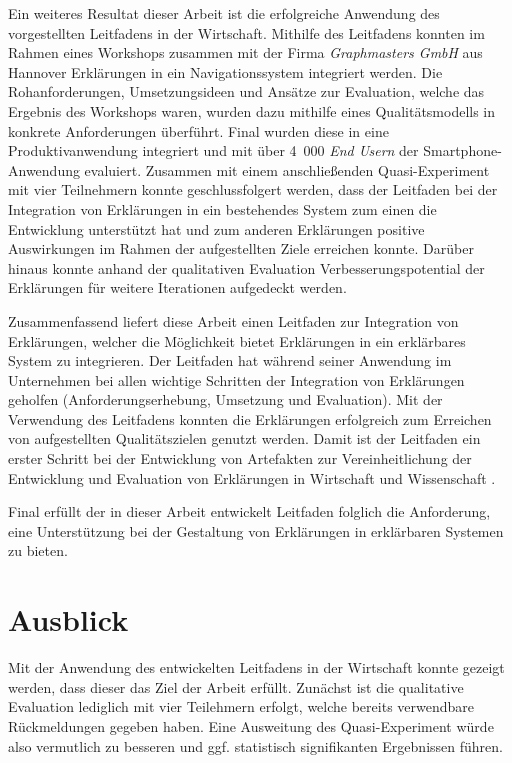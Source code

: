 Ein weiteres Resultat dieser Arbeit ist die erfolgreiche Anwendung des vorgestellten Leitfadens in der Wirtschaft. Mithilfe des Leitfadens konnten im Rahmen eines Workshops zusammen mit der Firma \textit{Graphmasters GmbH} aus Hannover Erklärungen in ein Navigationssystem integriert werden. Die Rohanforderungen, Umsetzungsideen und Ansätze zur Evaluation, welche das Ergebnis des Workshops waren, wurden dazu mithilfe eines Qualitätsmodells in konkrete Anforderungen überführt. Final wurden diese in eine Produktivanwendung integriert und mit über 4~000 \textit{End Usern} der Smartphone-Anwendung evaluiert. Zusammen mit einem anschließenden Quasi-Experiment mit vier Teilnehmern konnte geschlussfolgert werden, dass der Leitfaden bei der Integration von Erklärungen in ein bestehendes System zum einen die Entwicklung unterstützt hat und zum anderen Erklärungen positive Auswirkungen im Rahmen der aufgestellten Ziele erreichen konnte. Darüber hinaus konnte anhand der qualitativen Evaluation Verbesserungspotential der Erklärungen für weitere Iterationen aufgedeckt werden.

\bigskip

Zusammenfassend liefert diese Arbeit einen Leitfaden zur Integration von Erklärungen, welcher die Möglichkeit bietet Erklärungen in ein erklärbares System zu integrieren. Der Leitfaden hat während seiner Anwendung im Unternehmen bei allen wichtige Schritten der Integration von Erklärungen geholfen (Anforderungserhebung, Umsetzung und Evaluation). Mit der Verwendung des Leitfadens konnten die Erklärungen erfolgreich zum Erreichen von aufgestellten Qualitätszielen genutzt werden. Damit ist der Leitfaden ein erster Schritt bei der Entwicklung von Artefakten zur Vereinheitlichung der Entwicklung und Evaluation von Erklärungen in Wirtschaft und Wissenschaft \cite{kohl_explainability_2019,lim_2009_assessing,sokol_explainability_2020}.

Final erfüllt der in dieser Arbeit entwickelt Leitfaden folglich die Anforderung, eine Unterstützung bei der Gestaltung von Erklärungen in erklärbaren Systemen zu bieten.

\section{Ausblick}

Mit der Anwendung des entwickelten Leitfadens in der Wirtschaft konnte gezeigt werden, dass dieser das Ziel der Arbeit erfüllt. Zunächst ist die qualitative Evaluation lediglich mit vier Teilehmern erfolgt, welche bereits verwendbare Rückmeldungen gegeben haben. Eine Ausweitung des Quasi-Experiment würde also vermutlich zu besseren und ggf. statistisch signifikanten Ergebnissen führen.

